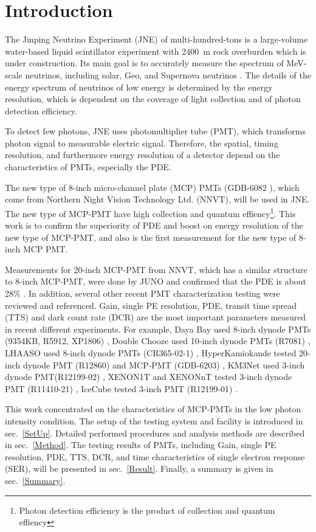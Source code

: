 \section{Introduction}
The Jinping Neutrino Experiment (JNE) of multi-hundred-tons is a large-volume water-based liquid scintillator experiment with \SI{2400}{m} rock overburden \cite{LetterJNE2017} which is under construction. Its main goal is to accurately measure the spectrum of MeV-scale neutrinos, including solar, Geo, and Supernova neutrinos \cite{LetterJNE2017}. The details of the energy spectrum of neutrinos of low energy is determined by the energy resolution, which is dependent on the coverage of light collection and of photon detection efficiency.

To detect few photons, JNE uses photomultiplier tube (PMT), which transforms photon signal to measurable electric signal. Therefore, the spatial, timing resolution, and furthermore energy resolution of a detector depend on the characteristics of PMTs, especially the PDE.

The new type of 8-inch micro-channel plate (MCP) PMTs (GDB-6082 \cite{GDB-6082}), which come from Northern Night Vision Technology Ltd. (NNVT), will be used in JNE. The new type of MCP-PMT have high collection and quantum effiency\footnote{Photon detection efficiency is the product of collection and quantum effiency}. This work is to confirm the superiority of PDE and boost on energy resolution of the new type of MCP-PMT, and also is the first measurement for the new type of 8-inch MCP PMT.

Measurements for 20-inch MCP-PMT from NNVT, which has a similar structure to 8-inch MCP-PMT, were done by JUNO and confirmed that the PDE is about 28\% \cite{JUNOMassTesting}. In addition, several other recent PMT characterization testing were reviewed and referenced. Gain, single PE resolution, PDE, transit time spread (TTS) and dark count rate (DCR) are the most important parameters measured in recent different experiments. For example, Daya Bay used 8-inch dynode PMTs (9354KB, R5912, XP1806) \cite{DayaBayTesting}, Double Chooze used 10-inch dynode PMTs (R7081) \cite{DoubleChoozeTesting}, LHAASO used 8-inch dynode PMTs (CR365-02-1) \cite{LHAASOTesting}, HyperKamiokande tested 20-inch dynode PMT (R12860) and MCP-PMT (GDB-6203) \cite{HyperKTesting}, KM3Net used 3-inch dynode PMT(R12199-02) \cite{KM3NetTesting}, XENON1T and XENONnT tested 3-inch dynode PMT (R11410-21) \cite{XENON1TTesting}\cite{XENONnTTesting}, IceCube tested 3-inch PMT (R12199-01) \cite{IceCubeTesting}.

This work concentrated on the characteristics of MCP-PMTs in the low photon intensity condition. The setup of the testing system and facility is introduced in sec.~\ref{SetUp}. Detailed performed procedures and analysis methods are described in sec.~\ref{Method}. The testing results of PMTs, including Gain, single PE resolution, PDE, TTS, DCR, and time characteristics of single electron response (SER), will be presented in sec.~\ref{Result}. Finally, a summary is given in sec.~\ref{Summary}.